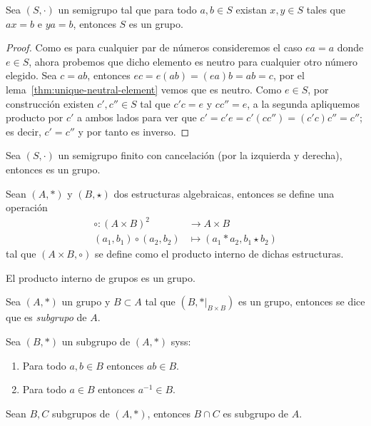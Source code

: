 \documentclass[11pt,oneside]{book}
\begin{document}
\begin{thm}
Sea $(S,\cdot)$ un semigrupo tal que para todo $a,b\in S$ existan $x,y\in S$ tales que $ax=b$ e $ya=b$, entonces $S$ es un grupo.
\end{thm}
\begin{proof}
Como es para cualquier par de números consideremos el caso $ea=a$ donde $e\in S$, ahora probemos que dicho elemento es neutro para cualquier otro número elegido. Sea $c=ab$, entonces $ec=e(ab)=(ea)b=ab=c$, por el lema~\ref{thm:unique-neutral-element} vemos que es neutro. Como $e\in S$, por construcción existen $c',c''\in S$ tal que $c'c=e$ y $cc''=e$, a la segunda apliquemos producto por $c'$ a ambos lados para ver que $c'=c'e=c'(cc'')=(c'c)c''=c''$; es decir, $c'=c''$ y por tanto es inverso.
\end{proof}
\begin{thm}
Sea $(S,\cdot)$ un semigrupo finito con cancelación (por la izquierda y derecha), entonces es un grupo.
\end{thm}
\begin{mydef}
Sean $(A,*)$ y $(B,\star)$ dos estructuras algebraicas, entonces se define una operación
\begin{align*}
\circ:(A\times B)^2&\longrightarrow A\times B\\
(a_1,b_1)\circ(a_2,b_2)&\longmapsto(a_1*a_2,b_1\star b_2)
\end{align*}
tal que $(A\times B,\circ)$ se define como el producto interno de dichas estructuras.
\end{mydef}
\begin{thm}
El producto interno de grupos es un grupo.
\end{thm}
\begin{mydef}[Subgrupo]
Sea $(A,*)$ un grupo y $B\subset A$ tal que $(B,*|_{B\times B})$ es un grupo, entonces se dice que es \textit{subgrupo} de $A$.
\end{mydef}
\begin{thm}
Sea $(B,*)$ un subgrupo de $(A,*)$ syss:
\begin{enumerate}[1)]
\item Para todo $a,b\in B$ entonces $ab\in B$.
\item Para todo $a\in B$ entonces $a^{-1}\in B$.
\end{enumerate}
\end{thm}
\begin{thm}
Sean $B,C$ subgrupos de $(A,*)$, entonces $B\cap C$ es subgrupo de $A$.
\end{thm}
\end{document}

